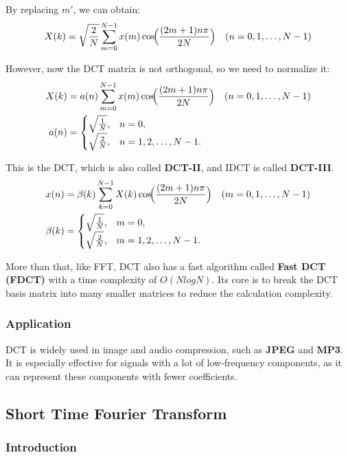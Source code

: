 \documentclass[12pt]{ctexart}
\begin{document}
By replacing $m'$, we can obtain:
\[
  X(k) = \sqrt{\frac{2}{N}}\sum_{m=0}^{N-1} x(m)\cos\!\Bigl(\frac{(2m+1)n\pi}{2N}\Bigr)
  \quad(n = 0,1,\dots,N-1)
\]

However, now the DCT matrix is not orthogonal, so we need to normalize it:
\begin{align}
  X(k) &= a(n)\sum_{m=0}^{N-1} x(m)\cos\!\Bigl(\frac{(2m+1)n\pi}{2N}\Bigr)
  \quad(n = 0,1,\dots,N-1)\\
  a(n) &= \begin{cases}
    \sqrt{\frac{1}{N}}, & n = 0,\\
    \sqrt{\frac{2}{N}}, & n = 1,2,\dots,N-1.
  \end{cases}
\end{align}

This is the DCT, which is also called \textbf{DCT-II}, and IDCT is called \textbf{DCT-III}.
\begin{align}
  x(n) &= \beta(k)\sum_{k=0}^{N-1} X(k)\cos\!\Bigl(\frac{(2m+1)n\pi}{2N}\Bigr)
  \quad(m = 0,1,\dots,N-1)\\
  \beta(k) &= \begin{cases}
    \sqrt{\frac{1}{N}}, & m = 0,\\
    \sqrt{\frac{2}{N}}, & m = 1,2,\dots,N-1.
  \end{cases}
\end{align}

More than that, like FFT, DCT also has a fast algorithm called \textbf{Fast DCT (FDCT)}
with a time complexity of $O(NlogN)$. Its core is to break the DCT basis matrix into many
smaller matrices to reduce the calculation complexity.

\subsubsection{\textbf{Application}}

DCT is widely used in image and audio compression, such as \textbf{JPEG} and \textbf{MP3}.
It is especially effective for signals with a lot of low-frequency components, as it can
represent these components with fewer coefficients.


\subsection{\textbf{Short Time Fourier Transform}}

\subsubsection{\textbf{Introduction}}
\end{document}
